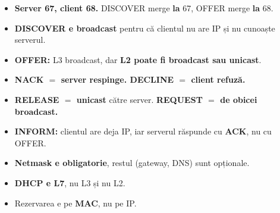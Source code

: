 \documentclass[11pt,a4paper]{article}
\begin{document}
\bigskip
\begin{capcana}
\begin{itemize}
  \item \textbf{Server 67, client 68.} DISCOVER merge \textbf{la} 67, OFFER merge \textbf{la} 68.
  \item \textbf{DISCOVER e broadcast} pentru că clientul nu are IP și nu cunoaște serverul.
  \item \textbf{OFFER:} L3 broadcast, dar \textbf{L2 poate fi broadcast sau unicast}.
  \item \textbf{NACK $=$ server respinge. DECLINE $=$ client refuză.}
  \item \textbf{RELEASE $=$ unicast} către server. \textbf{REQUEST $=$ de obicei broadcast.}
  \item \textbf{INFORM:} clientul are deja IP, iar serverul răspunde cu \textbf{ACK}, nu cu OFFER.
  \item \textbf{Netmask e obligatorie}, restul (gateway, DNS) sunt opționale.
  \item \textbf{DHCP e L7}, nu L3 și nu L2.
  \item Rezervarea e pe \textbf{MAC}, nu pe IP.
\end{itemize}
\end{capcana}
\end{document}
